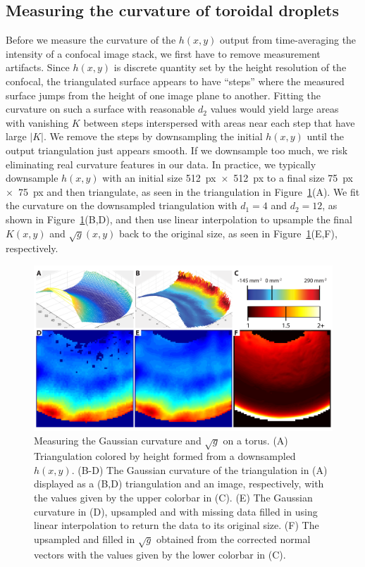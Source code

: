\subsection{Measuring the curvature of toroidal droplets}
Before we measure the curvature of the $h(x,y)$ output from time-averaging the intensity of a confocal image stack, we first have to remove measurement artifacts.
Since $h(x,y)$ is discrete quantity set by the height resolution of the confocal, the triangulated surface appears to have ``steps'' where the measured surface jumps from the height of one image plane to another.
Fitting the curvature on such a surface with reasonable $d_2$ values would yield large areas with vanishing $K$ between steps interspersed with areas near each step that have large $|K|$.
We remove the steps by downsampling the initial $h(x,y)$ until the output triangulation just appears smooth.
If we downsample too much, we risk eliminating real curvature features in our data.
In practice, we typically downsample $h(x,y)$ with an initial size 512~px~$\times$~512~px to a final size 75~px~$\times$~75~px and then triangulate, as seen in the triangulation in Figure~\ref{f:3-CurvFitTorus}(A).
We fit the curvature on the downsampled triangulation with $d_1 = 4$ and $d_2 = 12$, as shown in Figure~\ref{f:3-CurvFitTorus}(B,D), and then use linear interpolation to upsample the final $K(x,y)$ and $\sqrt{g}(x,y)$ back to the original size, as seen in Figure~\ref{f:3-CurvFitTorus}(E,F), respectively.
\begin{figure}
  \centering
  \includegraphics{figures/C3/Ch3-Figs_CurvFitTorus.png}
  \caption{Measuring the Gaussian curvature and $\sqrt{g}$ on a torus.
  (A) Triangulation colored by height formed from a downsampled $h(x,y)$.
  (B-D) The Gaussian curvature of the triangulation in (A) displayed as a (B,D) triangulation and an image, respectively, with the values given by the upper colorbar in (C).
  (E) The Gaussian curvature in (D), upsampled and with missing data filled in using linear interpolation to return the data to its original size.
  (F) The upsampled and filled in $\sqrt{g}$ obtained from the corrected normal vectors with the values given by the lower colorbar in (C).}\label{f:3-CurvFitTorus}
\end{figure}




